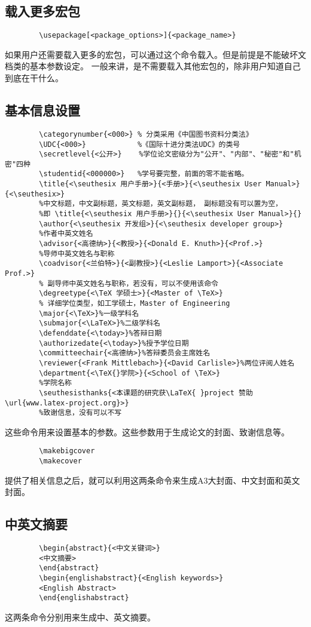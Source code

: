 \documentclass[figurelist,tablelist,algorithmlist,nomlist,masters]{seuthesix}
\begin{document}
	\subsection{载入更多宏包}
	{\color{magenta}
		\begin{verbatim}
		\usepackage[<package_options>]{<package_name>}
		\end{verbatim}
	}
	如果用户还需要载入更多的宏包，可以通过这个命令载入。但是前提是不能破坏\seuthesix 文档类的基本参数设定。
	一般来讲，是不需要载入其他宏包的，除非用户知道自己到底在干什么。
	
	\subsection{基本信息设置}
	{\color{magenta}
		\begin{verbatim}
		\categorynumber{<000>} % 分类采用《中国图书资料分类法》
		\UDC{<000>}            %《国际十进分类法UDC》的类号
		\secretlevel{<公开>}    %学位论文密级分为"公开"、"内部"、"秘密"和"机密"四种
		\studentid{<000000>}   %学号要完整，前面的零不能省略。
		\title{<\seuthesix 用户手册>}{<手册>}{<\seuthesix User Manual>}{<\seuthesix>}
		%中文标题，中文副标题，英文标题，英文副标题， 副标题没有可以置为空，
		%即 \title{<\seuthesix 用户手册>}{}{<\seuthesix User Manual>}{}
		\author{<\seuthesix 开发组>}{<\seuthesix developer group>}
		%作者中英文姓名
		\advisor{<高德纳>}{<教授>}{<Donald E. Knuth>}{<Prof.>}
		%导师中英文姓名与职称
		\coadvisor{<兰伯特>}{<副教授>}{<Leslie Lamport>}{<Associate Prof.>}
		% 副导师中英文姓名与职称，若没有，可以不使用该命令
		\degreetype{<\TeX 学硕士>}{<Master of \TeX>}
		% 详细学位类型，如工学硕士，Master of Engineering
		\major{<\TeX>}%一级学科名
		\submajor{<\LaTeX>}%二级学科名
		\defenddate{<\today>}%答辩日期
		\authorizedate{<\today>}%授予学位日期
		\committeechair{<高德纳>}%答辩委员会主席姓名
		\reviewer{<Frank Mittlebach>}{<David Carlisle>}%两位评阅人姓名
		\department{<\TeX{}学院>}{<School of \TeX>}
		%学院名称
		\seuthesisthanks{<本课题的研究获\LaTeX{ }project 赞助\url{www.latex-project.org}>}
		%致谢信息，没有可以不写
		\end{verbatim}
	}
	这些命令用来设置基本的参数。这些参数用于生成论文的封面、致谢信息等。
	
	
	{\color{magenta}
		\begin{verbatim}  
		\makebigcover
		\makecover
		\end{verbatim}
	}
	提供了相关信息之后，就可以利用这两条命令来生成A3大封面、中文封面和英文封面。
	
	
	\subsection{中英文摘要}
	{\color{magenta}
		\begin{verbatim}
		\begin{abstract}{<中文关键词>}
		<中文摘要>
		\end{abstract}
		\begin{englishabstract}{<English keywords>}
		<English Abstract>
		\end{englishabstract}
		\end{verbatim}
	}
	这两条命令分别用来生成中、英文摘要。
	
\end{document}
